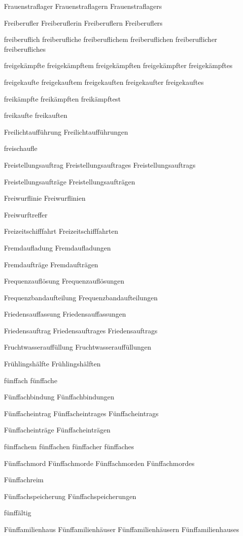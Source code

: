 Frauenstraflager
Frauenstraflagern
Frauenstraflagers

Freiberufler
Freiberuflerin
Freiberuflern
Freiberuflers

freiberuflich
freiberufliche
freiberuflichem
freiberuflichen
freiberuflicher
freiberufliches

freigekämpfte
freigekämpftem
freigekämpften
freigekämpfter
freigekämpftes

freigekaufte
freigekauftem
freigekauften
freigekaufter
freigekauftes

freikämpfte
freikämpften
freikämpftest

freikaufte
freikauften

Freilichtaufführung
Freilichtaufführungen

freischaufle

Freistellungsauftrag
Freistellungsauftrages
Freistellungsauftrags

Freistellungsaufträge
Freistellungsaufträgen

Freiwurflinie
Freiwurflinien

Freiwurftreffer

Freizeitschifffahrt
Freizeitschifffahrten

Fremdaufladung
Fremdaufladungen

Fremdaufträge
Fremdaufträgen

Frequenzauflösung
Frequenzauflösungen

Frequenzbandaufteilung
Frequenzbandaufteilungen

Friedensauffassung
Friedensauffassungen

Friedensauftrag
Friedensauftrages
Friedensauftrags

Fruchtwasserauffüllung
Fruchtwasserauffüllungen

Frühlingshälfte
Frühlingshälften

fünffach
fünffache

Fünffachbindung
Fünffachbindungen

Fünffacheintrag
Fünffacheintrages
Fünffacheintrags

Fünffacheinträge
Fünffacheinträgen

fünffachem
fünffachen
fünffacher
fünffaches

Fünffachmord
Fünffachmorde
Fünffachmorden
Fünffachmordes

Fünffachreim

Fünffachspeicherung
Fünffachspeicherungen

fünffältig

Fünffamilienhaus
Fünffamilienhäuser
Fünffamilienhäusern
Fünffamilienhauses

